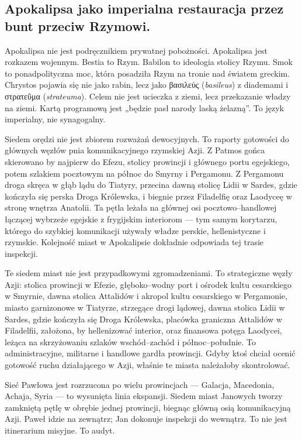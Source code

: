 \subsection{Apokalipsa jako imperialna restauracja przez bunt przeciw Rzymowi.}\label{subsec:revelation-as-imperial-restoration-by-revolt-from-rome}
Apokalipsa nie jest podręcznikiem prywatnej pobożności.
Apokalipsa jest rozkazem wojennym.
Bestia to Rzym.
Babilon to ideologia stolicy Rzymu.
Smok to ponadpolityczna moc, która posadziła Rzym na tronie nad światem greckim.
Chrystos pojawia się nie jako rabin, lecz jako βασιλεύς (\textit{basileus}) z diademami i στρατεῦμα (\textit{strateuma}).
Celem nie jest ucieczka z ziemi, lecz przekazanie władzy na ziemi.
Kartą programową jest „będzie pasł narody laską żelazną”.
To język imperialny, nie synagogalny.

Siedem orędzi nie jest zbiorem rozważań dewocyjnych.
To raporty gotowości do głównych węzłów pnia komunikacyjnego rzymskiej Azji.
Z Patmos gońca skierowano by najpierw do Efezu, stolicy prowincji i głównego portu egejskiego, potem szlakiem pocztowym na północ do Smyrny i Pergamonu.
Z Pergamonu droga skręca w głąb lądu do Tiatyry, przecina dawną stolicę Lidii w Sardes, gdzie kończyła się perska Droga Królewska, i biegnie przez Filadelfię oraz Laodyceę w stronę wnętrza Anatolii.
Ta pętla leżała na głównej osi pocztowo–handlowej łączącej wybrzeże egejskie z frygijskim interiorom — tym samym korytarzu, którego do szybkiej komunikacji używały władze perskie, hellenistyczne i rzymskie.
Kolejność miast w Apokalipsie dokładnie odpowiada tej trasie inspekcji.

Te siedem miast nie jest przypadkowymi zgromadzeniami.
To strategiczne węzły Azji: stolica prowincji w Efezie, głęboko–wodny port i ośrodek kultu cesarskiego w Smyrnie, dawna stolica Attalidów i akropol kultu cesarskiego w Pergamonie, miasto garnizonowe w Tiatyrze, strzegące drogi lądowej, dawna stolica Lidii w Sardes, gdzie kończyła się Droga Królewska, placówka graniczna Attalidów w Filadelfii, założona, by hellenizować interior, oraz finansowa potęga Laodycei, leżąca na skrzyżowaniu szlaków wschód–zachód i północ–południe.
To administracyjne, militarne i handlowe gardła prowincji.
Gdyby ktoś chciał ocenić gotowość ruchu działającego w Azji, właśnie te miasta należałoby skontrolować.

Sieć Pawłowa jest rozrzucona po wielu prowincjach — Galacja, Macedonia, Achaja, Syria — to wysunięta linia ekspansji.
Siedem miast Janowych tworzy zamkniętą pętlę w obrębie jednej prowincji, biegnąc główną osią komunikacyjną Azji.
Paweł idzie na zewnątrz; Jan dokonuje inspekcji do wewnątrz.
To nie jest itinerarium misyjne.
To audyt.

